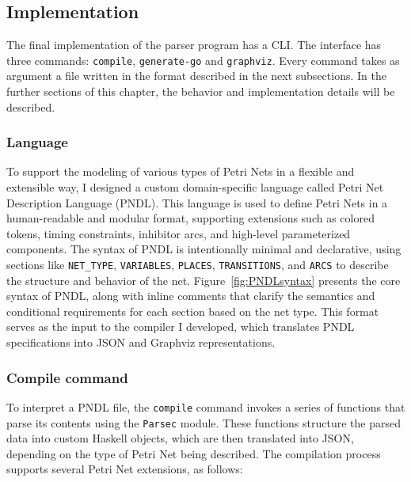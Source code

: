\documentclass[12pt]{article}
\begin{document}
    \subsection{Implementation}
        The final implementation of the parser program has a CLI. The interface has three commands: \texttt{compile}, \texttt{generate-go} and \texttt{graphviz}. Every command takes as argument a file written in the format described in the next subsections. In the further sections of this chapter, the behavior and implementation details will be described.
        \subsubsection{Language}
            To support the modeling of various types of Petri Nets in a flexible and extensible way, I designed a custom domain-specific language called Petri Net Description Language (PNDL). This language is used to define Petri Nets in a human-readable and modular format, supporting extensions such as colored tokens, timing constraints, inhibitor arcs, and high-level parameterized components. The syntax of PNDL is intentionally minimal and declarative, using sections like \texttt{NET\_TYPE}, \texttt{VARIABLES}, \texttt{PLACES}, \texttt{TRANSITIONS}, and \texttt{ARCS} to describe the structure and behavior of the net. 
            Figure~\ref{fig:PNDLsyntax} presents the core syntax of PNDL, along with inline comments that clarify the semantics and conditional requirements for each section based on the net type. This format serves as the input to the compiler I developed, which translates PNDL specifications into JSON and Graphviz representations.      
        \subsubsection{Compile command}
        To interpret a PNDL file, the \texttt{compile} command invokes a series of functions that parse its contents using the \texttt{Parsec} module. These functions structure the parsed data into custom Haskell objects, which are then translated into JSON, depending on the type of Petri Net being described. The compilation process supports several Petri Net extensions, as follows:
\end{document}
